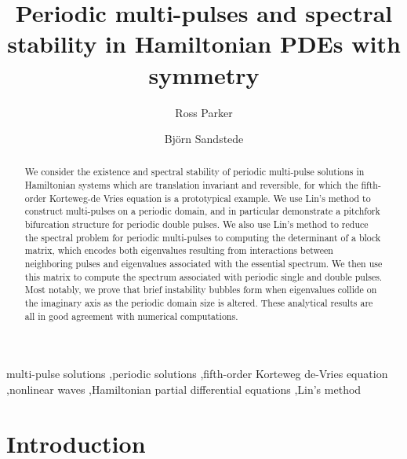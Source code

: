 \documentclass[12pt]{elsarticle}
\theoremstyle{plain}
\theoremstyle{definition}
\theoremstyle{remark}
\numberwithin{theorem}{section}
\numberwithin{equation}{section}
\begin{document}
\begin{frontmatter}

\title{Periodic multi-pulses and spectral stability in Hamiltonian PDEs with symmetry}

\author[1]{Ross Parker}
\author[2]{Bj\"{o}rn Sandstede}

\address[1]{Department of Mathematics, Southern Methodist University, 
Dallas, TX 75275, USA}
\address[2]{Division of Applied Mathematics, Brown University, Providence, RI 02912, USA}

\begin{abstract}
We consider the existence and spectral stability of periodic multi-pulse solutions in Hamiltonian systems which are translation invariant and reversible, for which the fifth-order Korteweg-de Vries equation is a prototypical example. We use Lin's method to construct multi-pulses on a periodic domain, and in particular demonstrate a pitchfork bifurcation structure for periodic double pulses. We also use Lin's method to reduce the spectral problem for periodic multi-pulses to computing the determinant of a block matrix, which encodes both eigenvalues resulting from interactions between neighboring pulses and eigenvalues associated with the essential spectrum. We then use this matrix to compute the spectrum associated with periodic single and double pulses. Most notably, we prove that brief instability bubbles form when eigenvalues collide on the imaginary axis as the periodic domain size is altered. These analytical results are all in good agreement with numerical computations.
\end{abstract}

\begin{keyword}
multi-pulse solutions \sep periodic solutions \sep fifth-order Korteweg de-Vries equation \sep nonlinear waves \sep Hamiltonian partial differential equations \sep Lin's method 
\end{keyword}

\end{frontmatter}

\section{Introduction}\label{sec:intro}
\end{document}
